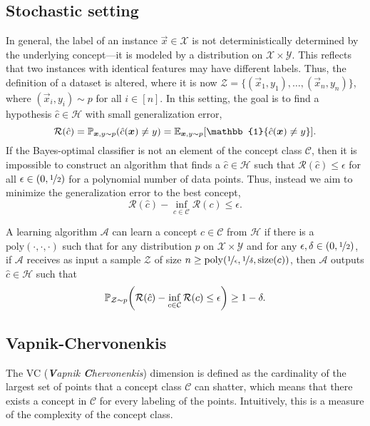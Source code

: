 \subsection{Stochastic setting}

In general, the label of an instance $\vec{x} \in \mathcal{X}$ is not deterministically determined
by the underlying concept---it is modeled by a distribution on $\mathcal{X} \times \mathcal{Y}$.
This reflects that two instances with identical features may have different labels. Thus, the
definition of a dataset is altered, where it is now $\mathcal{Z} = \{ (\vec{x}_1, y_1), \ldots,
    (\vec{x}_n, y_n) \}$, where $(\vec{x}_i, y_i) \sim p$ for all $i \in [n]$. In this setting, the
goal is to find a hypothesis $\hat{c} \in \mathcal{H}$ with small generalization error, \[
    \mathcal{R}(\hat{c}) = \mathbb{P}_{\vec{x},y \sim p} (\hat{c}(\vec{x}) \neq y) = \E_{\vec{x},y\sim p} \lft[ \mathbb{1}\{ \hat{c}(\vec{x}) \neq y \} \rgt].
\]
If the Bayes-optimal classifier is not an element of the concept class $\mathcal{C}$, then it is
impossible to construct an algorithm that finds a $\hat{c} \in \mathcal{H}$ such that
$\mathcal{R}(\hat{c}) \leq \epsilon$ for all $\epsilon \in (0,\nicefrac{1}{2})$ for a polynomial
number of data points. Thus, instead we aim to minimize the generalization error to the best
concept, \[
    \mathcal{R}(\hat{c}) - \inf_{c \in \mathcal{C}} \mathcal{R}(c) \leq \epsilon.
\]

\begin{definition}
    A learning algorithm $\mathcal{A}$ can learn a concept $c \in \mathcal{C}$ from $\mathcal{H}$ if
    there is a $\mathrm{poly}(\cdot, \cdot, \cdot)$ such that for any distribution $p$ on
    $\mathcal{X} \times \mathcal{Y}$ and for any $\epsilon,\delta\in (0,\nicefrac{1}{2})$, if
    $\mathcal{A}$ receives as input a sample $\mathcal{Z}$ of size $n \geq
        \mathrm{poly}(\nicefrac{1}{\epsilon},\nicefrac{1}{\delta},\mathrm{size}(c))$, then $\mathcal{A}$ outputs $\hat{c} \in \mathcal{H}$ such that \[
        \mathbb{P}_{\mathcal{Z} \sim p} \lft( \mathcal{R}(\hat{c}) - \inf_{c \in \mathcal{C}} \mathcal{R}(c) \leq \epsilon \rgt) \geq 1-\delta.
    \]
\end{definition}

\subsection{Vapnik-Chervonenkis}

The VC (\textit{\textbf{V}apnik \textbf{C}hervonenkis}) dimension is defined as the cardinality of
the largest set of points that a concept class $\mathcal{C}$ can shatter, which means that there
exists a concept in $\mathcal{C}$ for every labeling of the points. Intuitively, this is a measure
of the complexity of the concept class.


